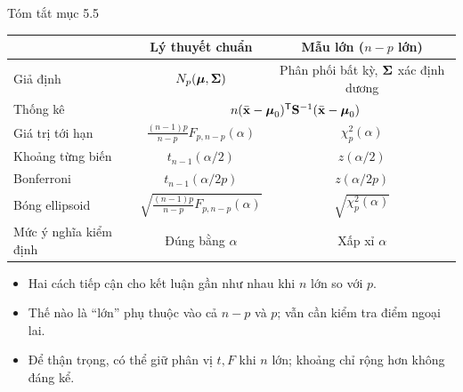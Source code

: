 \begin{frame}{Tóm tắt mục 5.5}
  \vspace{-0.15cm}
  \begin{center}
    \small
    \renewcommand{\arraystretch}{1.05}
    \setlength{\tabcolsep}{14pt}
    \begin{tabular}{@{}lcc@{}}
      \toprule
      & \textcolor{hustnavy}{\textbf{Lý thuyết chuẩn}} & \textcolor{hustteal}{\textbf{Mẫu lớn (\(n-p\) lớn)}} \\
      \midrule
      Giả định & \(N_p(\boldsymbol{\mu},\boldsymbol{\Sigma})\) & Phân phối bất kỳ, \(\boldsymbol{\Sigma}\) xác định dương \\
      Thống kê & \multicolumn{2}{c}{\(n(\bar{\mathbf{x}}-\boldsymbol{\mu}_0)^{\mathsf T}\mathbf{S}^{-1}(\bar{\mathbf{x}}-\boldsymbol{\mu}_0)\)} \\
      Giá trị tới hạn & \(\frac{(n-1)p}{n-p}F_{p,n-p}(\alpha)\) & \(\chi^2_p(\alpha)\) \\
      Khoảng từng biến & \(t_{n-1}(\alpha/2)\) & \(z(\alpha/2)\) \\
      Bonferroni & \(t_{n-1}(\alpha/2p)\) & \(z(\alpha/2p)\) \\
      Bóng ellipsoid & \(\sqrt{\frac{(n-1)p}{n-p}F_{p,n-p}(\alpha)}\) & \(\sqrt{\chi^2_p(\alpha)}\) \\
      Mức ý nghĩa kiểm định & Đúng bằng \(\alpha\) & Xấp xỉ \(\alpha\) \\
      \bottomrule
    \end{tabular}
  \end{center}
  \vspace{-0.2cm}
  \begin{itemize}
    \item Hai cách tiếp cận cho kết luận gần như nhau khi \(n\) lớn so với \(p\).
    \item Thế nào là ``lớn'' phụ thuộc vào cả \(n-p\) và \(p\); vẫn cần kiểm tra điểm ngoại lai.
    \item Để thận trọng, có thể giữ phân vị \(t, F\) khi \(n\) lớn; khoảng chỉ rộng hơn không đáng kể.
  \end{itemize}
\end{frame}

\endgroup
